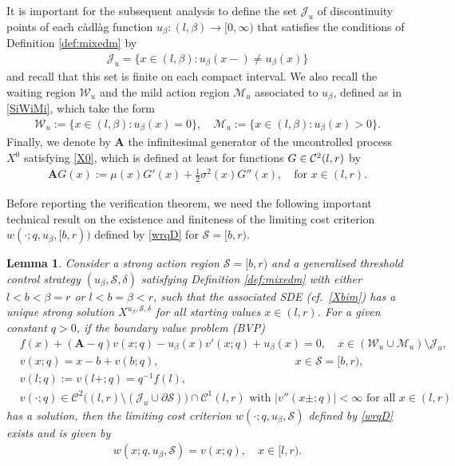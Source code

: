 \documentclass[11pt]{article} %
\newtheorem{lemma}[theorem]{Lemma}
\def\Af{\mathbf{A}}
\numberwithin{komcounter}{section}
\begin{document}
It is important for the subsequent analysis to define the set $\mathcal{J}_u$ of discontinuity points of each c\`adl\`ag function $u_\beta:(l,\beta) \to [0,\infty)$ that satisfies the conditions of Definition  \ref{def:mixedm}  
by 
\begin{align*}
    \mathcal{J}_u=\{x\in(l,\beta):u_\beta(x-) \neq u_\beta(x)\}
\end{align*}
and recall that this set is finite on each compact interval.  
We also recall the waiting region $\mathcal{W}_u$ and the mild action region $\mathcal{M}_u$ associated to $u_\beta$, defined as in \eqref{SiWiMi}, which take the form  
\begin{align}\label{eq:mild-string-u}
\mathcal{W}_u:=\{x\in(l,\beta) :u_\beta(x) = 0\},
\quad 
\mathcal{M}_u:=\{x\in(l,\beta) :u_\beta(x) > 0\}. 
\end{align}
Finally, we denote by $\Af$ the infinitesimal generator of the uncontrolled process $X^0$ satisfying \eqref{X0}, which is defined at least for functions $G \in {\cal C}^2(l,r)$ by
\begin{align*}
\mathbf{A} G(x) := \mu(x) G'(x) + \frac{1}{2}\sigma^2(x) G''(x), 
\quad \text{for } x \in (l,r).
\end{align*}

Before reporting the verification theorem, we need the following important technical result on the existence and finiteness of the limiting cost criterion $w(\cdot;q,u_\beta,[b,r))$ defined by \eqref{wrqD} for $\mathcal{S}=[b,r)$.  

\begin{lemma}\label{useful-lemma} 
Consider a strong action region $\mathcal{S}=[b,r)$ and a generalised threshold control strategy $(u_\beta,\mathcal{S},\delta)$ satisfying Definition \ref{def:mixedm} with either $l<b<\beta=r$ or $l<b=\beta<r$, such that the associated SDE (cf.~\eqref{Xbim}) has a unique strong solution $X^{u_\beta,\mathcal{S},\delta}$ for all starting values $x \in (l,r)$. 
For a given constant $q>0$, if the boundary value problem (BVP)
\begin{align}
&f(x) + (\mathbf{A}-q)v(x;q) - u_\beta(x) v'(x;q) + u_\beta(x) = 0, \quad x \in (\mathcal{W}_u \cup \mathcal{M}_u) \setminus \mathcal{J}_u, 
\label{BVPaa}\\
&v(x;q) = x - b + v(b;q), \qquad \qquad \qquad \qquad \qquad \qquad \, x \in \mathcal{S}=[b,r), 
\label{BVPab}\\
&v(l;q):=v(l+;q)=q^{-1}f(l), 
\label{BVPac}\\
& \text{$v(\cdot;q)\in \mathcal{C}^2\big( (l,r) \setminus (\mathcal{J}_u\cup \partial\mathcal{S}) \big) \cap \mathcal{C}^1(l,r)$ with $|v''(x\pm;q)|<\infty$ for all $x\in (l,r)$
}\label{BVPad}
\end{align} 
has a solution, then the limiting cost criterion $w(\cdot;q,u_\beta,\mathcal{S})$ defined by \eqref{wrqD} exists and is given by  
\begin{align} \label{w=w} 
w(x;q,u_\beta,\mathcal{S}) = v(x;q), \quad x \in [l,r).
\end{align}
\end{lemma}
\end{document}
